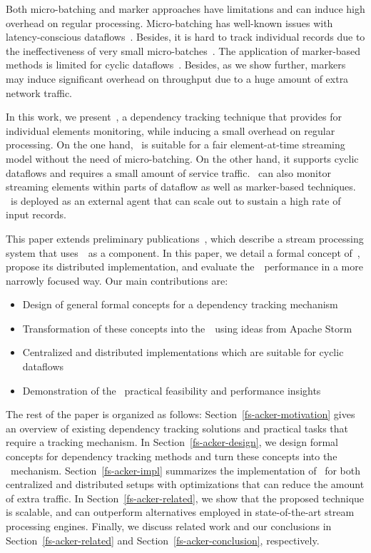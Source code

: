 Both micro-batching and marker approaches have limitations and can induce high overhead on regular processing. Micro-batching has well-known issues with latency-conscious dataflows~\cite{S7530084}. Besides, it is hard to track individual records due to the ineffectiveness of very small micro-batches~\cite{Zaharia:2012:DSE:2342763.2342773}. The application of marker-based methods is limited for cyclic dataflows~\cite{Carbone:2017:SMA:3137765.3137777}. Besides, as we show further, markers may induce significant overhead on throughput due to a huge amount of extra network traffic.

In this work, we present~\tracker , a dependency tracking technique that provides for individual elements monitoring, while inducing a small overhead on regular processing. On the one hand, \tracker\ is suitable for a fair element-at-time streaming model without the need of micro-batching. On the other hand, it supports cyclic dataflows and requires a small amount of service traffic. \tracker\ can also monitor streaming elements within parts of dataflow as well as marker-based techniques. \tracker\ is deployed as an external agent that can scale out to sustain a high rate of input records. 

This paper extends preliminary publications~\cite{we2018beyondmr, we2018adbis, thepaper}, which describe a stream processing system that uses~\tracker\ as a component. In this paper, we detail a formal concept of~\tracker , propose its distributed implementation, and evaluate the~\tracker\ performance in a more narrowly focused way. Our main contributions are:
\begin{itemize}
    \item Design of general formal concepts for a dependency tracking mechanism
    \item Transformation of these concepts into the~\tracker\ using ideas from Apache Storm {\em \acker}~\cite{Toshniwal:2014:STO:2588555.2595641}
    \item Centralized and distributed implementations which are suitable for cyclic dataflows
    \item Demonstration of the \tracker\ practical feasibility and performance insights
\end{itemize}

The rest of the paper is organized as follows: Section~\ref{fs-acker-motivation} gives an overview of existing dependency tracking solutions and practical tasks that require a tracking mechanism. In Section~\ref{fs-acker-design}, we design formal concepts for dependency tracking methods and turn these concepts into the \tracker\ mechanism. Section~\ref{fs-acker-impl} summarizes the implementation of \tracker\ for both centralized and distributed setups with optimizations that can reduce the amount of extra traffic. In Section~\ref{fs-acker-related}, we show that the proposed technique is scalable, and can outperform alternatives employed in state-of-the-art stream processing engines. Finally, we discuss related work and our conclusions in Section~\ref{fs-acker-related} and Section~\ref{fs-acker-conclusion}, respectively.